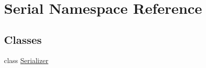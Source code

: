 \hypertarget{namespace_serial}{}\section{Serial Namespace Reference}
\label{namespace_serial}
\subsection*{Classes}
\begin{DoxyCompactItemize}
\item 
class \mbox{\hyperlink{class_serial_1_1_serializer}{Serializer}}
\end{DoxyCompactItemize}
